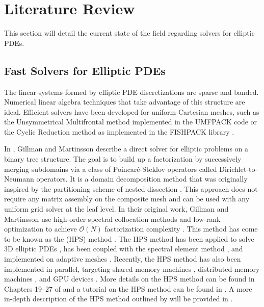 \section{Literature Review}

This section will detail the current state of the field regarding solvers for elliptic PDEs. 

\subsection{Fast Solvers for Elliptic PDEs}

The linear systems formed by elliptic PDE discretizations are sparse and banded. Numerical linear algebra techniques that take advantage of this structure are ideal. Efficient solvers have been developed for uniform Cartesian meshes, such as the Unsymmetrical Multifrontal method implemented in the UMFPACK code \cite{davis2004algorithm} or the Cyclic Reduction method \cite{swarztrauber1974direct} as implemented in the FISHPACK library \cite{swarztrauber1999fishpack,adams2016fishpack90}.

In \cite{gillman2014direct}, Gillman and Martinsson describe a direct solver for elliptic problems on a binary tree structure.
The goal is to build up a factorization by successively merging subdomains via a class of Poincar\'e-Steklov operators \cite{quarteroni1991theory} called Dirichlet-to-Neumann operators. It is a domain decomposition method that was originally inspired by the partitioning scheme of nested dissection \cite{george1973nested,lipton1979generalized}. This approach does not require any matrix assembly on the composite mesh and can be used with any uniform grid solver at the leaf level. In their original work, Gillman and Martinsson use high-order spectral collocation methods and low-rank optimization to achieve $\mathcal O(N)$ factorization complexity \cite{gillman2014direct}.  This method has come to be known as the \HPS (HPS) method \cite{martinsson2015hierarchical}. The HPS method has been applied to solve 3D elliptic PDEs \cite{hao2016direct}, has been coupled with the spectral element method \cite{fortunato2020ultraspherical}, and implemented on adaptive meshes \cite{babb2018accelerated, geldermans2019adaptive,chipman2024fast}. Recently, the HPS method has also been implemented in parallel, targeting shared-memory machines \cite{beams2020parallel}, distributed-memory machines \cite{yesypenko2022parallel}, and GPU devices \cite{yesypenko2022gpu}. More details on the HPS method can be found in Chapters 19--27 of \cite{martinsson2019fast} and a tutorial on the HPS method can be found in \cite{martinsson2015hierarchical}. A more in-depth description of the HPS method outlined by \cite{gillman2014direct} will be provided in .


